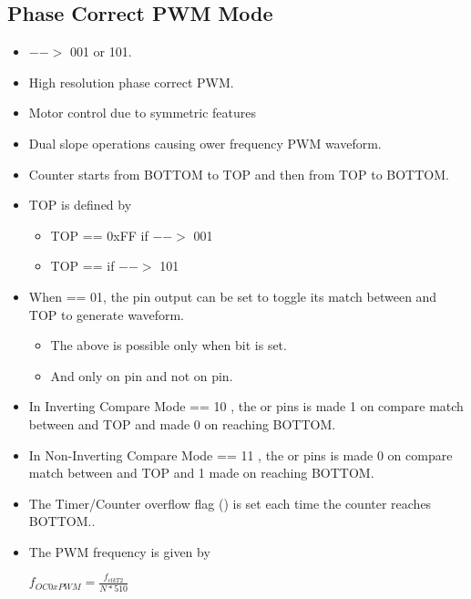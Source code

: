 \subsection{Phase Correct PWM Mode}
\begin{itemize}
    \item {} $-->$ 001 or 101.
    \item High resolution phase correct PWM.
    \item Motor control due to symmetric features
    \item Dual slope operations causing ower frequency PWM waveform.
    \item Counter starts from BOTTOM to TOP and then from TOP to BOTTOM.
    \item TOP is defined by
    \begin{itemize}
        \item TOP == 0xFF if  $-->$ 001
        \item TOP ==  if  $-->$ 101
    \end{itemize}
    \item  When  == 01, the  pin output can be set to toggle its match between  and TOP to generate waveform.
    \begin{itemize}
        \item The above is possible only when  bit is set.
        \item And only on  pin and not on  pin.
    \end{itemize}
    \item In Inverting Compare Mode  == 10 , the  or  pins is made 1 on compare match between  and TOP and made 0 on reaching BOTTOM.
    \item In Non-Inverting Compare Mode  == 11 , the  or  pins is made 0 on compare match between  and TOP and 1 made  on reaching BOTTOM.
    \item The Timer/Counter overflow flag () is set each time the counter reaches BOTTOM..
    \item The PWM frequency is given by 
    \begin{center}
        { \Large $f_{OC0xPWM} = \frac{f_{clkT2}}{N * 510}$ }
    \end{center}
\end{itemize}

